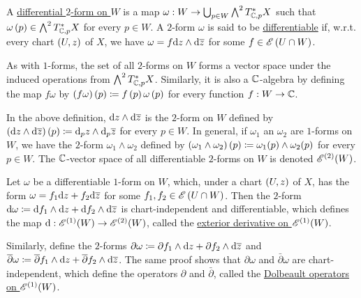 \documentclass[../Moduli_Spaces_of_Riemann_Surfaces.tex]{subfiles}
\begin{document}
    \begin{definition}
        A \ul{differential $2$-form on $W$} is a map $\omega:W\to\bigcup_{p\in W}\bigwedge^2T_{\mathbb{C},p}^\ast X$ such that $\omega\left(p\right)\in\bigwedge^2T_{\mathbb{C},p}^\ast X$ for every $p\in W$. A $2$-form $\omega$ is said to be \ul{differentiable} if, w.r.t. every chart $\left(U,z\right)$ of $X$, we have $\omega=f\mathrm{d} z\wedge\mathrm{d}\overline{z}$ for some $f\in\mathscr{E}\left(U\cap W\right)$.
    \end{definition}
    \begin{remark}
        As with $1$-forms, the set of all $2$-forms on $W$ forms a vector space under the induced operations from $\bigwedge^2T_{\mathbb{C},p}^\ast X$. Similarly, it is also a $\mathbb{C}$-algebra by defining the map $f\omega$ by $\left(f\omega\right)\left(p\right)\coloneqq f\left(p\right)\omega\left(p\right)$ for every function $f:W\to \mathbb{C}$.\exqed
    \end{remark}
    \begin{remark}
        In the above definition, $\mathrm{d} z\wedge\mathrm{d}\overline{z}$ is the $2$-form on $W$ defined by $\left(\mathrm{d} z\wedge\mathrm{d}\overline{z}\right)\left(p\right)\coloneqq\mathrm{d}_pz\wedge\mathrm{d}_p\overline{z}$ for every $p\in W$. In general, if $\omega_1$ an $\omega_2$ are $1$-forms on $W$, we have the $2$-form $\omega_1\wedge\omega_2$ defined by $\left(\omega_1\wedge\omega_2\right)\left(p\right)\coloneqq\omega_1\!\left(p\right)\wedge\omega_2\!\left(p\right)$ for every $p\in W$. The $\mathbb{C}$-vector space of all differentiable $2$-forms on $W$ is denoted $\mathscr{E}^{\left(2\right)}\!\left(W\right)$.\exqed
    \end{remark}
    \begin{defprop}
        Let $\omega$ be a differentiable $1$-form on $W$, which, under a chart $\left(U,z\right)$ of $X$, has the form $\omega=f_1\mathrm{d} z+f_2\mathrm{d}\overline{z}$ for some $f_1,f_2\in\mathscr{E}\left(U\cap W\right)$. Then the $2$-form $\mathrm{d}\omega\coloneqq\mathrm{d} f_1\wedge\mathrm{d} z+\mathrm{d} f_2\wedge\mathrm{d}\overline{z}$ is chart-independent and differentiable, which defines the map $\mathrm{d}:\mathscr{E}^{\left(1\right)}\!\left(W\right)\to\mathscr{E}^{\left(2\right)}\!\left(W\right)$, called the \ul{exterior derivative on $\mathscr{E}^{\left(1\right)}\!\left(W\right)$}.
    \end{defprop}
    \begin{remark}
        Similarly, define the $2$-forms $\partial\omega\coloneqq\partial f_1\wedge\mathrm{d} z+\partial f_2\wedge\mathrm{d}\overline{z}$ and $\overline{\partial}\omega\coloneqq\overline{\partial}f_1\wedge\mathrm{d} z+\overline{\partial}f_2\wedge\mathrm{d}\overline{z}$. The same proof shows that $\partial\omega$ and $\bar{\partial}\omega$ are chart-independent, which define the operators $\partial$ and $\bar{\partial}$, called the \ul{Dolbeault operators on $\mathscr{E}^{\left(1\right)}\!\left(W\right)$}.\exqed
    \end{remark}
\end{document}
